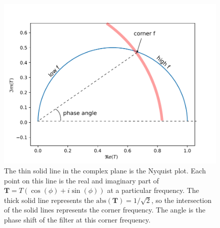 \documentclass{article}
\begin{document}
\begin{figure}
  \centering
  \includegraphics[width=\columnwidth]{images/nyquist_annotated}
  \caption{The thin solid line in the complex plane is the Nyquist
    plot. Each point on this line is the real and imaginary part of
    $\mathbf{T} = T(\cos(\phi)+ i \sin(\phi))$ at a particular
    frequency. The thick solid line represents the
    $\mbox{abs}(\mathbf{T})=1/\sqrt{2}$, so the intersection of the
    solid lines represents the corner frequency. The angle is the
    phase shift of the filter at this corner frequency.}
  \label{fig:nyquist}
\end{figure}
\end{document}
